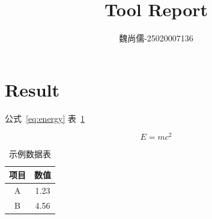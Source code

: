 \documentclass{article}
\begin{document}
\title{Tool Report}
\author{魏尚儒-25020007136}
\maketitle

\section{Result}

公式~\eqref{eq:energy}
表~\ref{tab:sample}

\begin{equation}
E = m c^2 \label{eq:energy}
\end{equation}

\begin{table}[h]
\centering
\caption{示例数据表}\label{tab:sample}
\begin{tabular}{|c|c|}
\hline
项目 & 数值 \\
\hline
A & 1.23 \\
B & 4.56 \\
\hline
\end{tabular}
\end{table}
\end{document}
